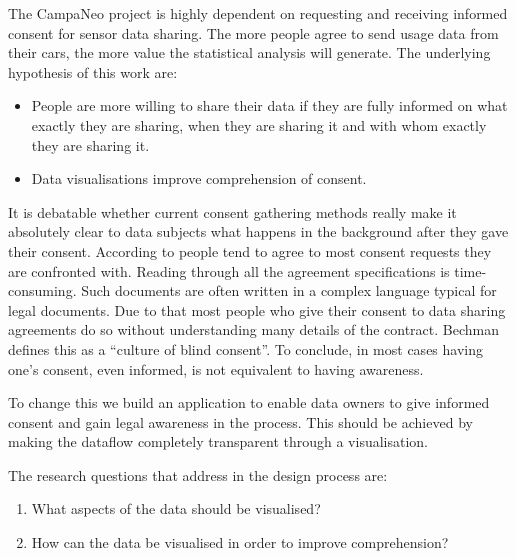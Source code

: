 
The CampaNeo project is highly dependent on requesting and receiving  informed consent for sensor data sharing. 
The more people agree to send usage data from their cars, the more value the statistical analysis will generate.
The underlying hypothesis of this work are:
\begin{itemize}
    \item People are more willing to share their data if they are fully informed on what exactly they are sharing, when they are sharing it and with whom exactly they are sharing it.
    \item Data visualisations improve comprehension of consent. 
\end{itemize}
It is debatable whether current consent gathering methods really make it absolutely clear to data subjects what happens in the background after they gave their consent. According to \cite{Borgesisus_informed_consent_2015} people tend to agree to most consent requests they are confronted with.
Reading through all the agreement specifications is time-consuming. Such documents are often written in a complex language typical for legal documents.
Due to that most people who give their consent to data sharing agreements do so without understanding many details of the contract. Bechman \cite{Bechmann2014} defines this as a “culture of blind consent”. To conclude, in most cases having one’s consent, even informed, is not equivalent to having awareness.

To change this we build an application to enable data owners to give informed consent and gain legal awareness in the process. This should be achieved by making the dataflow completely transparent through a visualisation.

The research questions that address in the design process are:
\begin{enumerate}
    \item What aspects of the data should be visualised?
    \item How can the data be visualised in order to improve comprehension?
\end{enumerate}




